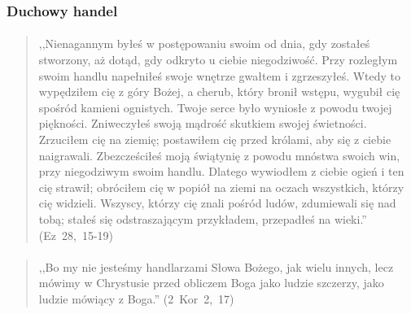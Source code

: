 \documentclass[10pt,a4paper,oneside]{article}
\begin{document}
\subsubsection{Duchowy handel}
\paragraph{}
\begin{quote}
,,Nienagannym byłeś w postępowaniu swoim od dnia, gdy zostałeś stworzony, aż dotąd, gdy odkryto u ciebie niegodziwość. Przy rozległym swoim handlu napełniłeś swoje wnętrze gwałtem i zgrzeszyłeś. Wtedy to wypędziłem cię z góry Bożej, a cherub, który bronił wstępu, wygubił cię spośród kamieni ognistych. Twoje serce było wyniosłe z powodu twojej piękności. Zniweczyłeś swoją mądrość skutkiem swojej świetności. Zrzuciłem cię na ziemię; postawiłem cię przed królami, aby się z ciebie naigrawali. Zbezcześciłeś moją świątynię z powodu mnóstwa swoich win, przy niegodziwym swoim handlu. Dlatego wywiodłem z ciebie ogień i ten cię strawił; obróciłem cię w popiół na ziemi na oczach wszystkich, którzy cię widzieli. Wszyscy, którzy cię znali pośród ludów, zdumiewali się nad tobą; stałeś się odstraszającym przykładem, przepadłeś na wieki.'' \mbox{(Ez 28, 15-19)}
\end{quote}
\paragraph{}
\begin{quote}
,,Bo my nie jesteśmy handlarzami Słowa Bożego, jak wielu innych, lecz mówimy w Chrystusie przed obliczem Boga jako ludzie szczerzy, jako ludzie mówiący z Boga.'' \mbox{(2 Kor 2, 17)}
\end{quote}
\end{document}
